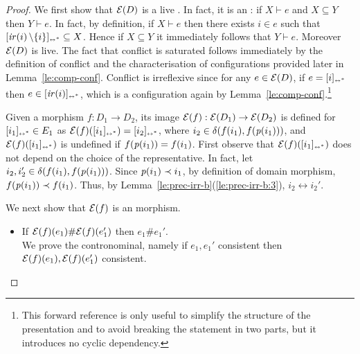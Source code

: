 \begin{proof}

  

  We first show that $\mathcal{E}({D})$ is a live {\esabbr}. In fact, it is an
  {\esabbr}: if $X \vdash e$ and $X \subseteq Y$ then
  $Y \vdash e$. In fact, by definition, if $X \vdash e$ then there
  exists $i \in e$ such that
  $[{\mathop{\mathit{ir}({i})} \setminus \{i\}}]_{\scriptscriptstyle {\leftrightarrow^*}} \subseteq X$. Hence if
  $X \subseteq Y$ it immediately follows that $Y \vdash e$.
  Moreover $\mathcal{E}({D})$ is live. The fact that conflict is saturated
  follows immediately by the definition of conflict and the
  characterisation of configurations provided later in
  Lemma~\ref{le:comp-conf}. Conflict is irreflexive since for any
  $e \in \mathcal{E}({D})$, if $e = [{i}]_{\scriptscriptstyle {\leftrightarrow^*}}$ then
  $e \in [{\mathop{\mathit{ir}({i})}}]_{\scriptscriptstyle {\leftrightarrow^*}}$, which is a configuration again by
  Lemma~\ref{le:comp-conf}.\footnote{This forward reference is only
    useful to simplify the structure of the presentation and to avoid
    breaking the statement in two parts, but it
    introduces no cyclic dependency.}

  \bigskip

  Given a morphism $f : D_1 \to D_2$, its image
  $\mathcal{E}({f}) : \mathcal{E}({D_1}) \to \mathcal{E}({D_2})$ is defined for
  $[{i_1}]_{\scriptscriptstyle {\leftrightarrow^*}} \in {E_1}$ as
  $\mathcal{E}({f})([{i_1}]_{\scriptscriptstyle {\leftrightarrow^*}})= [{i_2}]_{\scriptscriptstyle {\leftrightarrow^*}}$,
  where $i_2 \in \delta({f(i_1)},{f(\mathit{p}({i_1}))})$, and
  $\mathcal{E}({f})([{i_1}]_{\scriptscriptstyle {\leftrightarrow^*}})$ is undefined if $f(\mathit{p}({i_1})) = f(i_1)$.
  First observe that $\mathcal{E}({f})([{i_1}]_{\scriptscriptstyle {\leftrightarrow^*}})$ does
  not depend on the choice of the representative. In fact, let
  $i_2, i_2' \in \delta({f(i_1)},{f(\mathit{p}({i_1}))})$.  Since
  $\mathit{p}({i_1}) \prec i_1$, by definition of domain morphism,
  $f(\mathit{p}({i_1})) \prec f(i_1)$. Thus, by
  Lemma~\ref{le:prec-irr-b}(\ref{le:prec-irr-b:3}),
  $i_2 \leftrightarrow i_2'$.  

  We next show that $\mathcal{E}({f})$ is an {\esabbr} morphism.
  \begin{itemize}
  \item If $\mathcal{E}({f})(e_1) \# \mathcal{E}({f})(e_1')$ then $e_1 \# e_1'$.\\
    We prove the contronominal, namely if $e_1,e_1'$ consistent
    then $\mathcal{E}({f})(e_1),\mathcal{E}({f})(e_1')$ consistent.


\end{itemize}
\end{proof}
